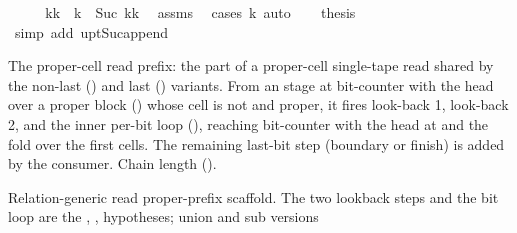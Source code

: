 \begin{isabellebody}
%
\isadelimproof
%
\endisadelimproof
%
\isatagproof
{}\isamarkupfalse%
\ {\isacharminus}{\kern0pt}\isanewline
\ \ \isamarkupfalse%
\ kk\ \ {\isachardoublequoteopen}k\ {\isacharequal}{\kern0pt}\ Suc\ kk{\isachardoublequoteclose}\ \isamarkupfalse%
\ assms\ \isamarkupfalse%
\ {\isacharparenleft}{\kern0pt}cases\ k{\isacharparenright}{\kern0pt}\ auto\isanewline
\ \ \isamarkupfalse%
\ {\isacharquery}{\kern0pt}thesis\ \isamarkupfalse%
\ {\isacharparenleft}{\kern0pt}simp\ add{\isacharcolon}{\kern0pt}\ upt{\isacharunderscore}{\kern0pt}Suc{\isacharunderscore}{\kern0pt}append{\isacharparenright}{\kern0pt}\isanewline
{}\isamarkupfalse%
%
\endisatagproof
{\isafoldproof}%
%
\isadelimproof
%
\endisadelimproof
%
\begin{isamarkuptext}%
The proper-cell read prefix: the part of a proper-cell
  single-tape read shared by the non-last () and last
  () variants.  From an  stage at
  bit-counter  with the head over a proper block
   () whose cell is not
   and  proper, it fires look-back 1, look-back
  2, and the inner per-bit loop (), reaching
  bit-counter  with the head at  and
   the fold over the first  cells.  The
  remaining last-bit step (boundary or finish) is added by the
  consumer.  Chain length  ().%
\end{isamarkuptext}\isamarkuptrue%
%
\begin{isamarkuptext}%
Relation-generic read proper-prefix scaffold.  The two
  lookback steps and the bit loop are the ,
  ,  hypotheses; union and sub versions

\end{isamarkuptext}
\end{isabellebody}
